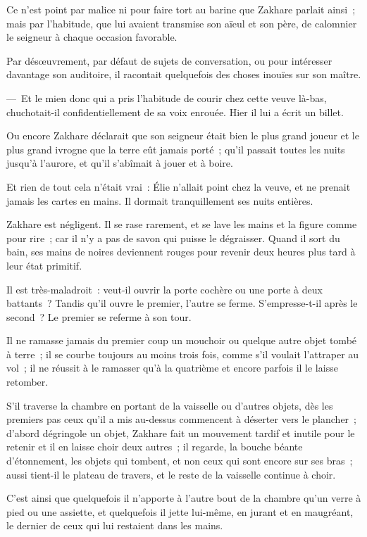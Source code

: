 \documentclass[french,twoside]{book} %
\begin{document}
Ce n’est point par malice ni pour faire tort au barine que Zakhare parlait ainsi ; mais par l’habitude, que lui avaient transmise son aïeul et son père, de calomnier le seigneur à chaque occasion favorable.\par
Par désœuvrement, par défaut de sujets de conversation, ou pour intéresser davantage son auditoire, il racontait quelquefois des choses inouïes sur son maître.\par
— Et le mien donc qui a pris l’habitude de courir chez cette veuve là-bas, chuchotait-il confidentiellement de sa voix enrouée. Hier il lui a écrit un billet.\par
Ou encore Zakhare déclarait que son seigneur était bien le plus grand joueur et le plus grand ivrogne que la terre eût jamais porté ; qu’il passait toutes les nuits jusqu’à l’aurore, et qu’il s’abîmait à jouer et à boire.\par
Et rien de tout cela n’était vrai : Élie n’allait point chez la veuve, et ne prenait jamais les cartes en mains. Il dormait tranquillement ses nuits entières.\par
Zakhare est négligent. Il se rase rarement, et se lave les mains et la figure comme pour rire ; car il n’y a pas de savon qui puisse le dégraisser. Quand il sort du bain, ses mains de noires deviennent rouges pour revenir deux heures plus tard à leur état primitif.\par
Il est très-maladroit : veut-il ouvrir la porte cochère ou une porte à deux battants ? Tandis qu’il ouvre le premier, l’autre se ferme. S’empresse-t-il après le second ? Le premier se referme à son tour.\par
Il ne ramasse jamais du premier coup un mouchoir ou quelque autre objet tombé à terre ; il se courbe toujours au moins trois fois, comme s’il voulait l’attraper au vol ; il ne réussit à le ramasser qu’à la quatrième et encore parfois il le laisse retomber.\par
S’il traverse la chambre en portant de la vaisselle ou d’autres objets, dès les premiers pas ceux qu’il a mis au-dessus commencent à déserter vers le plancher ; d’abord dégringole un objet, Zakhare fait un mouvement tardif et inutile pour le retenir et il en laisse choir deux autres ; il regarde, la bouche béante d’étonnement, les objets qui tombent, et non ceux qui sont encore sur ses bras ; aussi tient-il le plateau de travers, et le reste de la vaisselle continue à choir.\par
C’est ainsi que quelquefois il n’apporte à l’autre bout de la chambre qu’un verre à pied ou une assiette, et quelquefois il jette lui-même, en jurant et en maugréant, le dernier de ceux qui lui restaient dans les mains.\par
\end{document}
